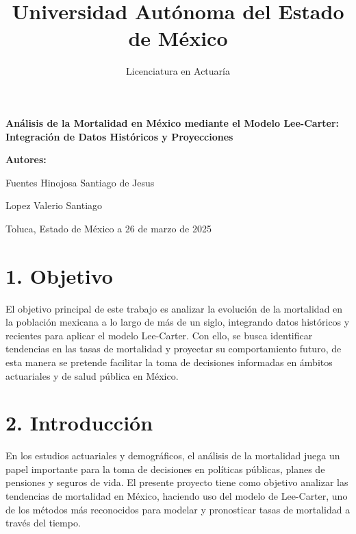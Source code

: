 \documentclass[
]{article}
\title{Universidad Autónoma del Estado de México}
\subtitle{Licenciatura en Actuaría}
\author{}
\date{\vspace{-2.5em}}
\begin{document}
\maketitle

\begin {centering}
\Huge \bfseries Análisis de la Mortalidad en México mediante el Modelo Lee-Carter: Integración de Datos Históricos y Proyecciones \par
\end {centering}
\vspace*{4cm}

\vspace{1cm}
\vspace{2cm}

\begin{centering}
\huge \bfseries 
Autores:


Fuentes Hinojosa Santiago de Jesus

Lopez Valerio Santiago \par
\end{centering}
\vspace*{2cm}

\vfill
\large  \par
\vfill

Toluca, Estado de México a 26 de marzo de 2025

\clearpage
\raggedright

\clearpage

\justify

\hypertarget{objetivo}{%
\section{1. Objetivo}\label{objetivo}}

El objetivo principal de este trabajo es analizar la evolución de la
mortalidad en la población mexicana a lo largo de más de un siglo,
integrando datos históricos y recientes para aplicar el modelo
Lee-Carter. Con ello, se busca identificar tendencias en las tasas de
mortalidad y proyectar su comportamiento futuro, de esta manera se
pretende facilitar la toma de decisiones informadas en ámbitos
actuariales y de salud pública en México.

\hypertarget{introducciuxf3n}{%
\section{2. Introducción}\label{introducciuxf3n}}

En los estudios actuariales y demográficos, el análisis de la mortalidad
juega un papel importante para la toma de decisiones en políticas
públicas, planes de pensiones y seguros de vida. El presente proyecto
tiene como objetivo analizar las tendencias de mortalidad en México,
haciendo uso del modelo de Lee-Carter, uno de los métodos más
reconocidos para modelar y pronosticar tasas de mortalidad a través del
tiempo.
\end{document}
